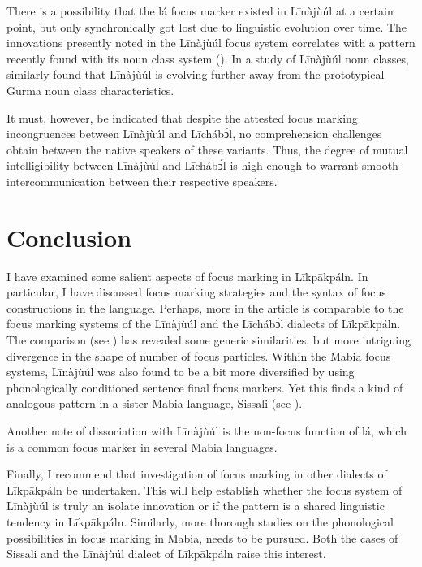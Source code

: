 \documentclass[output=paper,colorlinks,citecolor=brown]{langscibook}
\begin{document}
There is a possibility that the lá focus marker existed in Līnàjùúl at a certain point, but only synchronically got lost due to linguistic evolution over time. The innovations presently noted in the Līnàjùúl focus system correlates with a pattern recently found with its noun class system (\citet{BisilkiAkpanglo-Nartey2017}). In a study of Līnàjùúl noun classes, \citet{BisilkiAkpanglo-Nartey2017} similarly found that Līnàjùúl is evolving further away from the prototypical Gurma noun class characteristics.

It must, however, be indicated that despite the attested focus marking incongruences between Līnàjùúl and Līchábͻ́l, no comprehension challenges obtain between the native speakers of these variants. Thus, the degree of mutual intelligibility between Līnàjùúl and Līchábͻ́l is high enough to warrant smooth intercommunication between their respective speakers.

\section{Conclusion}\label{sec:bisilki:9}

I have examined some salient aspects of focus marking in Līkpākpáln. In particular, I have discussed focus marking strategies and the syntax of focus constructions in the language. Perhaps, more in the article is comparable to the focus marking systems of the Līnàjùúl and the Līchábͻ́l dialects of Līkpākpáln. The comparison (see ) has revealed some generic similarities, but more intriguing divergence in the shape of number of focus particles. Within the Mabia focus systems, Līnàjùúl was also found to be a bit more diversified by using phonologically conditioned sentence final focus markers. Yet this finds a kind of analogous pattern in a sister Mabia language, Sissali (see ).

Another note of dissociation with Līnàjùúl is the non-focus function of lá, which is a common focus marker in several Mabia languages.

Finally, I recommend that investigation of focus marking in other dialects of Līkpākpáln be undertaken. This will help establish whether the focus system of Līnàjùúl is truly an isolate innovation or if the pattern is a shared linguistic tendency in Līkpākpáln. Similarly, more thorough studies on the phonological possibilities in focus marking in Mabia, needs to be pursued. Both the cases of Sissali and the Līnàjùúl dialect of Līkpākpáln raise this interest.
\end{document}
